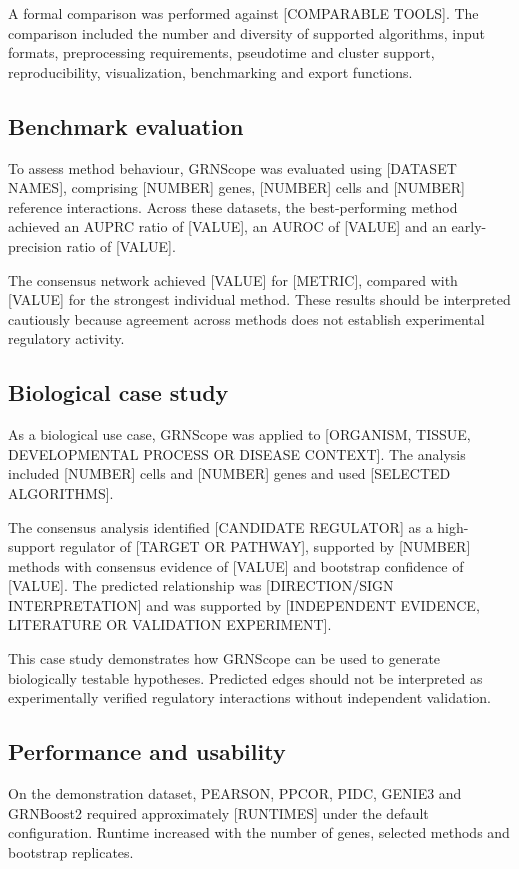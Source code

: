 \documentclass[unnumsec,webpdf,modern,large]{oup-authoring-template}%
\begin{document}
A formal comparison was performed against [COMPARABLE TOOLS]. The comparison included the number and diversity of supported algorithms, input formats, preprocessing requirements, pseudotime and cluster support, reproducibility, visualization, benchmarking and export functions.

\subsection{Benchmark evaluation}

To assess method behaviour, GRNScope was evaluated using [DATASET NAMES], comprising [NUMBER] genes, [NUMBER] cells and [NUMBER] reference interactions. Across these datasets, the best-performing method achieved an AUPRC ratio of [VALUE], an AUROC of [VALUE] and an early-precision ratio of [VALUE].

The consensus network achieved [VALUE] for [METRIC], compared with [VALUE] for the strongest individual method. These results should be interpreted cautiously because agreement across methods does not establish experimental regulatory activity.

\subsection{Biological case study}

As a biological use case, GRNScope was applied to [ORGANISM, TISSUE, DEVELOPMENTAL PROCESS OR DISEASE CONTEXT]. The analysis included [NUMBER] cells and [NUMBER] genes and used [SELECTED ALGORITHMS].

The consensus analysis identified [CANDIDATE REGULATOR] as a high-support regulator of [TARGET OR PATHWAY], supported by [NUMBER] methods with consensus evidence of [VALUE] and bootstrap confidence of [VALUE]. The predicted relationship was [DIRECTION/SIGN INTERPRETATION] and was supported by [INDEPENDENT EVIDENCE, LITERATURE OR VALIDATION EXPERIMENT].

This case study demonstrates how GRNScope can be used to generate biologically testable hypotheses. Predicted edges should not be interpreted as experimentally verified regulatory interactions without independent validation.

\subsection{Performance and usability}

On the demonstration dataset, PEARSON, PPCOR, PIDC, GENIE3 and GRNBoost2 required approximately [RUNTIMES] under the default configuration. Runtime increased with the number of genes, selected methods and bootstrap replicates.
\end{document}
